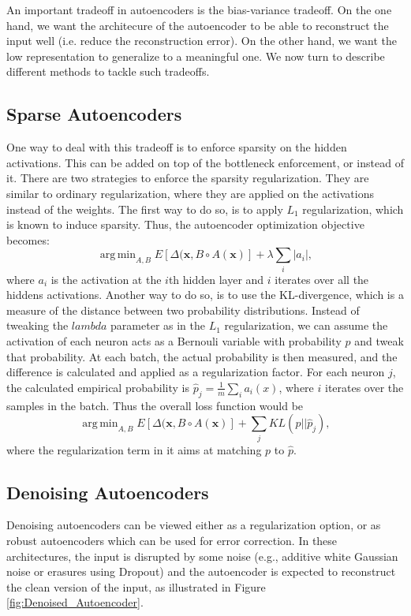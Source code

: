 \documentclass[graybox]{svmult}
\DeclareMathOperator{\argmin}{arg\,min}
\newcommand{\mb}[1]{\mathbf{#1}}
\newcommand{\bx}[0]{\mb{x}}
\begin{document}
An important tradeoff in autoencoders is the bias-variance tradeoff. On the one hand, we want the architecure of the autoencoder to be able to reconstruct the input well (i.e. reduce the reconstruction error). On the other hand, we want the low representation to generalize to a meaningful one.
We now turn to describe different methods to tackle such tradeoffs.



\subsection{Sparse Autoencoders}
\label{sec:sparse_autoencoders}
One way to deal with this tradeoff is to enforce sparsity on the hidden activations. This can be added on top of the bottleneck enforcement, or instead of it. There are two strategies to enforce the sparsity regularization. They are similar to ordinary regularization, where they are applied on the activations instead of the weights.
The first way to do so, is to apply $L_1$ regularization, which is known to induce sparsity.  Thus, the autoencoder optimization objective becomes:
\begin{equation}
\argmin_{A,B}E[\Delta(\bx, B\circ A (\bx)]+\lambda\sum_i{|a_i|},
\end{equation}
where $a_i$ is the activation at the $i$th hidden layer and $i$ iterates over all the hiddens activations.
Another way to do so, is to use the KL-divergence, which is a measure of the distance between two probability distributions. Instead of tweaking the $lambda$ parameter as in the $L_1$ regularization, we can assume the activation of each neuron acts as a Bernouli variable with probability $p$ and tweak that probability. At each batch, the actual probability is then measured, and the difference is calculated and applied as a regularization factor. For each neuron $j$, the calculated empirical probability is $\hat{p}_j=\frac{1}{m}\sum_i{a_i(x)}$, where $i$ iterates over the samples in the batch.
Thus the overall loss function would be
\begin{equation}
\argmin_{A,B}E[\Delta(\bx, B\circ A (\bx)]+\sum_j{KL(p||\hat{p}_j)},
\end{equation}
where the regularization term in it aims at matching $p$ to $
\hat{p}$.

\subsection{Denoising Autoencoders}
\label{sec:denoising_autoencoders}
Denoising autoencoders \cite{Denoising_AutoEncoders} can be viewed either as a regularization option, or as robust autoencoders which can be used for error correction. In these architectures, the input is disrupted by some noise (e.g., additive white Gaussian noise or erasures using Dropout) and the autoencoder is expected to reconstruct the clean version of the input, as illustrated in Figure \ref{fig:Denoised_Autoencoder}.
\end{document}
